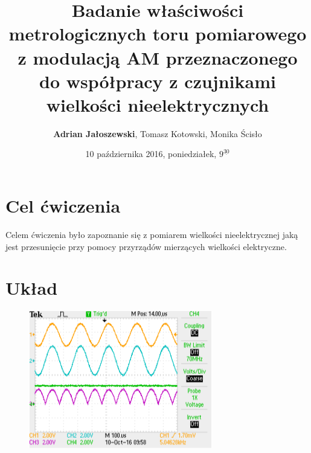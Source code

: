 \documentclass[a4paper, 12pt, titlepage]{article}
\title{Badanie właściwości metrologicznych toru pomiarowego z modulacją AM przeznaczonego do współpracy z czujnikami wielkości nieelektrycznych}
\author{\textbf{Adrian Jałoszewski}, Tomasz Kotowski, Monika Ścisło}
\date{10 października 2016, poniedziałek, $9^{\underline{30}}$}
\begin{document}
	\maketitle
	\section{Cel ćwiczenia}
	Celem ćwiczenia było zapoznanie się z pomiarem wielkości nieelektrycznej jaką jest przesunięcie przy pomocy przyrządów mierzących wielkości elektryczne.
	\section{Układ}
	
	\begin{figure}[H]
		\centering
		\includegraphics[height=6cm, width=\textwidth]{./img/rozciagniete.png}
	\end{figure}
	
\end{document}
